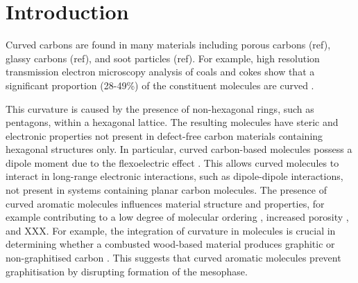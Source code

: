 

%
\section{Introduction}
\label{sec:Introduction}

Curved carbons are found in many materials including porous carbons (ref), glassy carbons (ref), and soot particles (ref).
For example, high resolution transmission electron microscopy analysis of coals and cokes show that a significant proportion (28-49\%) of the constituent molecules are curved \cite{wang2017improved,zhong2018structural}. %


This curvature is caused by the presence of non-hexagonal rings, such as pentagons, within a hexagonal lattice. The resulting molecules have steric and electronic properties not present in defect-free carbon materials containing hexagonal structures only. In particular, curved carbon-based molecules possess a dipole moment due to the flexoelectric effect \cite{Martin2017}. This allows curved molecules to interact in long-range electronic interactions, such as dipole-dipole interactions, not present in systems containing planar carbon molecules.
The presence of curved aromatic molecules influences material structure and properties, for example contributing to a low degree of molecular ordering %
\cite{zhong2018structural}, increased porosity \cite{zhang2020molecular}, %
and XXX. For example, the integration of curvature in molecules is crucial in determining whether a combusted wood-based material produces graphitic or non-graphitised carbon \cite{abrahamson2018carbon}. This suggests that curved aromatic molecules prevent graphitisation by disrupting formation of the mesophase. %


